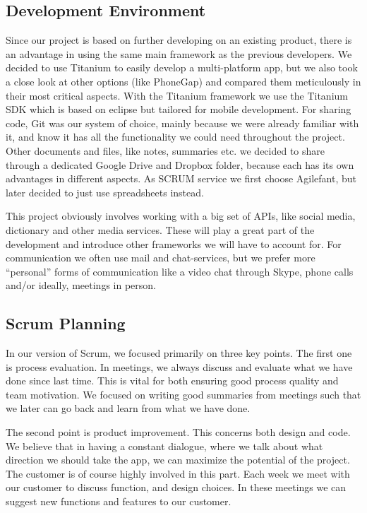 \subsection{Development Environment}

Since our project is based on further developing on an existing product, there is an advantage in using the same main framework as the previous developers. We decided to use Titanium to easily develop a multi-platform app, but we also took a close look at other options (like PhoneGap) and compared them meticulously in their most critical aspects. With the Titanium framework we use the Titanium SDK which is based on eclipse but tailored for mobile development. For sharing code, Git was our system of choice, mainly because we were already familiar with it, and know it has all the functionality we could need throughout the project. Other documents and files, like notes, summaries etc. we decided to share through a dedicated Google Drive and Dropbox folder, because each has its own advantages in different aspects. As SCRUM service we first choose Agilefant, but later decided to just use spreadsheets instead.

This project obviously involves working with a big set of APIs, like social media, dictionary and other media services. These will play a great part of the development and introduce other frameworks we will have to account for. For communication we often use mail and chat-services, but we prefer more “personal” forms of communication like a video chat through Skype, phone calls and/or ideally, meetings in person.

\subsection{Scrum Planning}
In our version of Scrum, we focused primarily on three key points. The first one is process evaluation. In meetings, we always discuss and evaluate what we have done since last time. This is vital for both ensuring good process quality and team motivation. We focused on writing good summaries from meetings such that we later can go back and learn from what we have done.

The second point is product improvement. This concerns both design and code. We believe that in having a constant dialogue, where we talk about what direction we should take the app, we can maximize the potential of the project. The customer is of course highly involved in this part. Each week we meet with our customer to discuss function, and design choices. In these meetings we can suggest new functions and features to our customer.

